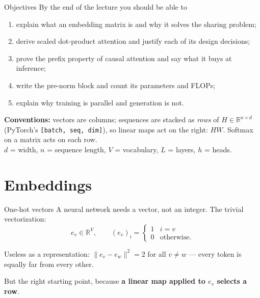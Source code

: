 \documentclass[11pt,aspectratio=169]{beamer}
\newcommand{\R}{\mathbb{R}}
\newcommand{\dest}[1]{\textcolor{structure}{\textbf{#1}}}
\begin{document}
\begin{frame}{Objectives}
  By the end of the lecture you should be able to
  \begin{enumerate}
    \item explain what an embedding matrix is and why it solves the sharing problem;
    \item derive scaled dot-product attention and justify each of its design decisions;
    \item prove the prefix property of causal attention and say what it buys at inference;
    \item write the pre-norm block and count its parameters and FLOPs;
    \item explain why training is parallel and generation is not.
  \end{enumerate}

  \vspace{1em}
  \textbf{Conventions:} vectors are columns; sequences are stacked as \emph{rows} of
  $H\in\R^{n\times d}$ (PyTorch's \texttt{[batch, seq, dim]}), so linear maps act on the
  right: $HW$. Softmax on a matrix acts on each row.\\
  $d$ = width, $n$ = sequence length, $V$ = vocabulary, $L$ = layers, $h$ = heads.
\end{frame}

\section{Embeddings}

\begin{frame}{One-hot vectors}
  A neural network needs a vector, not an integer. The trivial vectorization:
  \[
    e_v\in\R^V,\qquad (e_v)_i = \begin{cases}1 & i = v\\ 0 & \text{otherwise.}\end{cases}
  \]

  \vspace{0.6em}
  Useless as a representation: $\|e_v - e_w\|^2 = 2$ for all $v\neq w$ --- every token
  is equally far from every other.

  \vspace{0.8em}
  But the right starting point, because \dest{a linear map applied to $e_v$ selects a row}.
\end{frame}
\end{document}
